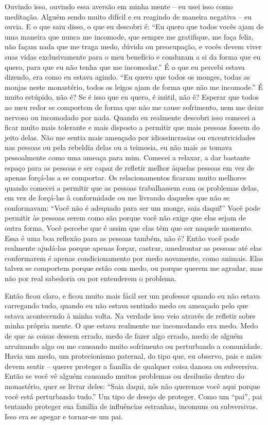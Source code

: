 Ouvindo isso, ouvindo essa aversão em minha mente – eu usei isso
como meditação. Alguém sendo muito difícil e eu reagindo de maneira
negativa – eu ouvia. E o que saiu disso, o que eu descobri é: “Eu quero
que todos vocês ajam de uma maneira que nunca me incomode, que sempre
me gratifique, me faça feliz, não façam nada que me traga medo, dúvida
ou preocupação, e vocês devem viver suas vidas exclusivamente para o
meu benefício e conduzam a si da forma que eu quero, para que eu não
tenha que me incomodar.” É o que eu percebi estava dizendo, era como eu
estava agindo. “Eu quero que todos os monges, todas as monjas neste
monastério, todos os leigos ajam de forma que não me incomode.” É muito
estúpido, não é? Se é isso que eu quero, é inútil, não é? Esperar que
todos ao meu redor se comportem de forma que não me cause sofrimento,
nem me deixe nervoso ou incomodado por nada. Quando eu realmente
descobri isso comecei a ficar muito mais tolerante e mais disposto a
permitir que mais pessoas fossem do jeito delas. Não me sentia mais
ameaçado por idiossincrasias ou excentricidades nas pessoas ou pela
rebeldia delas ou a teimosia, eu não mais as tomava pessoalmente como
uma ameaça para mim. Comecei a relaxar, a dar bastante espaço para as
pessoas e ser capaz de refletir melhor àquelas pessoas em vez de apenas
forçá-las a se comportar. Os relacionamentos ficaram muito melhores
quando comecei a permitir que as pessoas trabalhassem com os problemas
delas, em vez de forçá-las à conformidade ou me livrando daqueles que
não se conformavam: “Você não é adequado para ser um monge, saia
daqui!” Você pode permitir às pessoas serem como são porque você não
exige que elas sejam de outra forma. Você percebe que é assim que elas
têm que ser naquele momento. Essa é uma boa reflexão para as pessoas
também, não é? Então você pode realmente ajudá-las porque apenas
forçar, castrar, amedrontar as pessoas até elas conformarem é apenas
condicionamento por medo novamente, como animais. Elas talvez se
comportem porque estão com medo, ou porque querem me agradar, mas não
por real sabedoria ou por entenderem o problema. 

Então ficou claro, e ficou muito mais fácil ser um professor quando
eu não estava carregando tudo, quando eu não estava sentindo medo ou
ameaçado pelo que estava acontecendo à minha volta. Na verdade isso
veio através de refletir sobre minha própria mente. O que estava
realmente me incomodando era medo. Medo de que as coisas dessem errado,
medo de fazer algo errado, medo de alguém arruinando algo ou me
causando muito sofrimento ou perturbando a comunidade. Havia um medo,
um protecionismo paternal, do tipo que, eu observo, pais e mães devem
sentir – querer proteger a família de qualquer coisa danosa ou
subversiva. Então se você vê alguém causando muitos problemas ou
desilusão dentro do monastério, quer se livrar deles: “Saia daqui, nós
não queremos você aqui porque você está perturbando tudo.” Um tipo de
desejo de proteger. Como um “pai”, pai tentando proteger sua família de
influências estranhas, incomuns ou subversivas. Isso era se apegar e
tornar-se um pai. 

